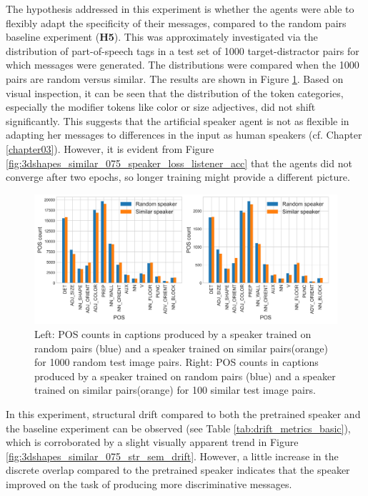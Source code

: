 The hypothesis addressed in this experiment is whether the agents were able to flexibly adapt the specificity of their messages, compared to the random pairs baseline experiment (\textbf{H5}). This was approximately investigated via the distribution of part-of-speech tags in a test set of 1000 target-distractor pairs for which messages were generated. The distributions were compared when the 1000 pairs are random versus similar. The results are shown in Figure \ref{fig:3dshapes_pos}. Based on visual inspection, it can be seen that the distribution of the token categories, especially the modifier tokens like color or size adjectives, did not shift significantly. This suggests that the artificial speaker agent is not as flexible in adapting her messages to differences in the input as human speakers (cf. Chapter \ref{chapter03}). However, it is evident from Figure \ref{fig:3dshapes_similar_075_speaker_loss_listener_acc} that the agents did not converge after two epochs, so longer training might provide a different picture. 

\begin{figure}
	\centering
	\includegraphics[width=\linewidth]{images/3dshapes_random_vs_similar_POS_counts.png}
	\caption{Left: POS counts in captions produced by a speaker trained on random pairs (blue) and a speaker trained on similar pairs(orange) for 1000 random test image pairs. Right: POS counts in captions produced by a speaker trained on random pairs (blue) and a speaker trained on similar pairs(orange) for 100 similar test image pairs. }
	\label{fig:3dshapes_pos}
\end{figure}

In this experiment, structural drift compared to both the pretrained speaker and the baseline experiment can be observed (see Table \ref{tab:drift_metrics_basic}), which is corroborated by a slight visually apparent trend in Figure \ref{fig:3dshapes_similar_075_str_sem_drift}. However, a little increase in the discrete overlap compared to the pretrained speaker indicates that the speaker improved on the task of producing more discriminative messages.


